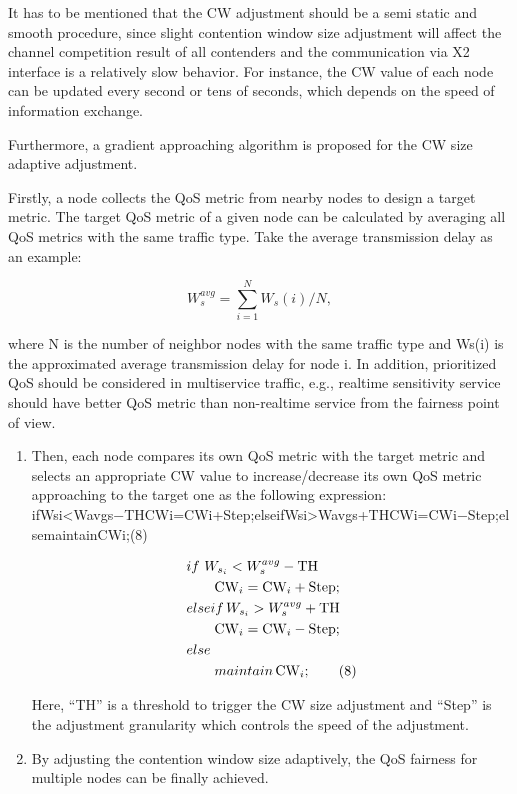 \documentclass{IEEEtran}
\begin{document}
\begin{itemize}
   It has to be mentioned that the CW adjustment should be a semi static and smooth procedure, since slight contention window size adjustment will affect the channel competition result of all contenders and the communication via X2 interface is a relatively slow behavior. For instance, the CW value of each node can be updated every second or tens of seconds, which depends on the speed of information exchange.\cite{Tao2015}

Furthermore, a gradient approaching algorithm is proposed for the CW size adaptive adjustment.

    Firstly, a node collects the QoS metric from nearby nodes to design a target metric. The target QoS metric of a given node can be calculated by averaging all QoS metrics with the same traffic type. Take the average transmission delay as an example:  
    
    \begin{equation*}W_{s}^{avg}=\sum_{i=1}^{N}W_{s}(i)/N, \tag{7}\end{equation*}
    
    where N is the number of neighbor nodes with the same traffic type and Ws(i) is the approximated average transmission delay for node i. In addition, prioritized QoS should be considered in multiservice traffic, e.g., realtime sensitivity service should have better QoS metric than non-realtime service from the fairness point of view.
    
    \begin{enumerate}
    	\item Then, each node compares its own QoS metric with the target metric and selects an appropriate CW value to increase/decrease its own QoS metric approaching to the target one as the following expression:
ifWsi<Wavgs−THCWi=CWi+Step;elseifWsi>Wavgs+THCWi=CWi−Step;elsemaintainCWi;(8)

\begin{align*}&if\,\, W_{s_{i}} < W_{s}^{avg}-\text{TH}\notag\\ &\qquad \text{CW}_{i}=\text{CW}_{i}+\text{Step};\notag\\ &elseif\, W_{s_{i}} > W_{s}^{avg}+\text{TH}\notag\\ &\qquad \text{CW}_{i}=\text{CW}_{i}-\text{Step};\notag\\ &else\notag\\ &\qquad maintain\, \text{CW}_{i};\tag{8}\end{align*}

Here, “TH” is a threshold to trigger the CW size adjustment and “Step” is the adjustment granularity which controls the speed of the adjustment.



        \item By adjusting the contention window size adaptively, the QoS fairness for multiple nodes can be finally achieved.
    \end{enumerate}
  
\end{itemize}
\end{document}

